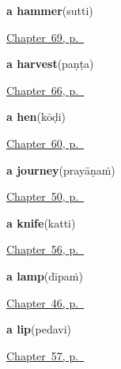 \noindent\begin{minipage}[t]{\linewidth}
\raggedright
\textbf{a hammer}\enspace\emph{}\enspace(sutti)\par
\footnotesize \hyperref[ch:te-tools]{Chapter~69, p.~\pageref*{ch:te-tools}}
\end{minipage}\par\smallskip

\noindent\begin{minipage}[t]{\linewidth}
\raggedright
\textbf{a harvest}\enspace\emph{}\enspace(paṇṭa)\par
\footnotesize \hyperref[ch:te-the-field]{Chapter~66, p.~\pageref*{ch:te-the-field}}
\end{minipage}\par\smallskip

\noindent\begin{minipage}[t]{\linewidth}
\raggedright
\textbf{a hen}\enspace\emph{}\enspace(kōḍi)\par
\footnotesize \hyperref[ch:te-animals]{Chapter~60, p.~\pageref*{ch:te-animals}}
\end{minipage}\par\smallskip

\noindent\begin{minipage}[t]{\linewidth}
\raggedright
\textbf{a journey}\enspace\emph{}\enspace(prayāṇaṁ)\par
\footnotesize \hyperref[ch:te-leave-more]{Chapter~50, p.~\pageref*{ch:te-leave-more}}
\end{minipage}\par\smallskip

\noindent\begin{minipage}[t]{\linewidth}
\raggedright
\textbf{a knife}\enspace\emph{}\enspace(katti)\par
\footnotesize \hyperref[ch:te-house]{Chapter~56, p.~\pageref*{ch:te-house}}
\end{minipage}\par\smallskip

\noindent\begin{minipage}[t]{\linewidth}
\raggedright
\textbf{a lamp}\enspace\emph{}\enspace(dīpaṁ)\par
\footnotesize \hyperref[ch:te-ask-for]{Chapter~46, p.~\pageref*{ch:te-ask-for}}
\end{minipage}\par\smallskip

\noindent\begin{minipage}[t]{\linewidth}
\raggedright
\textbf{a lip}\enspace\emph{}\enspace(pedavi)\par
\footnotesize \hyperref[ch:te-more-body]{Chapter~57, p.~\pageref*{ch:te-more-body}}
\end{minipage}\par\smallskip

